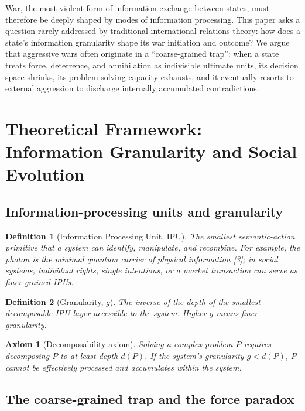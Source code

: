 \documentclass[11pt,a4paper]{article}
\newtheorem{definition}{Definition}
\newtheorem{axiom}{Axiom}
\begin{document}
War, the most violent form of information exchange between states, must therefore be deeply shaped by modes of information processing. This paper asks a question rarely addressed by traditional international-relations theory: how does a state's information granularity shape its war initiation and outcome? We argue that aggressive wars often originate in a ``coarse-grained trap'': when a state treats force, deterrence, and annihilation as indivisible ultimate units, its decision space shrinks, its problem-solving capacity exhausts, and it eventually resorts to external aggression to discharge internally accumulated contradictions.

\section{Theoretical Framework: Information Granularity and Social Evolution}

\subsection{Information-processing units and granularity}

\begin{definition}[Information Processing Unit, IPU]
The smallest semantic-action primitive that a system can identify, manipulate, and recombine. For example, the photon is the minimal quantum carrier of physical information [3]; in social systems, individual rights, single intentions, or a market transaction can serve as finer-grained IPUs.
\end{definition}

\begin{definition}[Granularity, $g$]
The inverse of the depth of the smallest decomposable IPU layer accessible to the system. Higher $g$ means finer granularity.
\end{definition}

\begin{axiom}[Decomposability axiom]
Solving a complex problem $P$ requires decomposing $P$ to at least depth $d(P)$. If the system's granularity $g < d(P)$, $P$ cannot be effectively processed and accumulates within the system.
\end{axiom}

\subsection{The coarse-grained trap and the force paradox}
\end{document}
